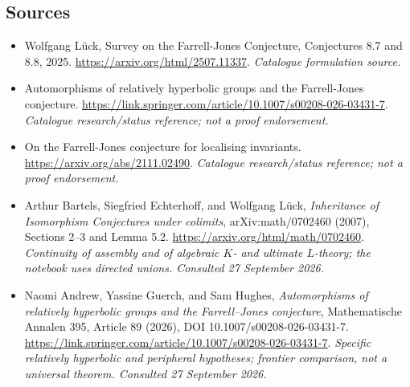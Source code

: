 \documentclass[11pt,a4paper]{article}
\numberwithin{equation}{section}
\begin{document}
\subsection{Sources}
\begin{itemize}\raggedright
\item[\textnormal{[S1]}]\hypertarget{source:statement:1}{} Wolfgang Lück, Survey on the Farrell-Jones Conjecture, Conjectures 8.7 and 8.8, 2025.
\url{https://arxiv.org/html/2507.11337}.
{\small\textit{Catalogue formulation source.}}
\item[\textnormal{[S2]}]\hypertarget{source:statement:2}{} Automorphisms of relatively hyperbolic groups and the Farrell-Jones conjecture.
\url{https://link.springer.com/article/10.1007/s00208-026-03431-7}.
{\small\textit{Catalogue research/status reference; not a proof endorsement.}}
\item[\textnormal{[S3]}]\hypertarget{source:statement:3}{} On the Farrell-Jones conjecture for localising invariants.
\url{https://arxiv.org/abs/2111.02490}.
{\small\textit{Catalogue research/status reference; not a proof endorsement.}}

\item[\textnormal{[E1]}]\hypertarget{extra:statement:1}{} Arthur Bartels, Siegfried Echterhoff, and Wolfgang Lück, \emph{Inheritance of Isomorphism Conjectures under colimits}, arXiv:math/0702460 (2007), Sections 2--3 and Lemma 5.2.
\url{https://arxiv.org/html/math/0702460}.
{\small\textit{Continuity of assembly and of algebraic $K$- and ultimate $L$-theory; the notebook uses directed unions. Consulted 27 September 2026.}}
\item[\textnormal{[E2]}]\hypertarget{extra:statement:2}{} Naomi Andrew, Yassine Guerch, and Sam Hughes, \emph{Automorphisms of relatively hyperbolic groups and the Farrell--Jones conjecture}, Mathematische Annalen 395, Article 89 (2026), DOI 10.1007/s00208-026-03431-7.
\url{https://link.springer.com/article/10.1007/s00208-026-03431-7}.
{\small\textit{Specific relatively hyperbolic and peripheral hypotheses; frontier comparison, not a universal theorem. Consulted 27 September 2026.}}
\end{itemize}
\end{document}
